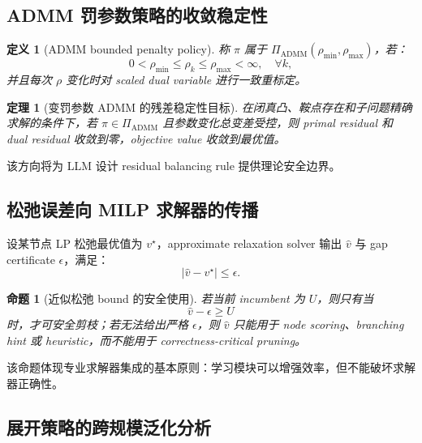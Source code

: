 \documentclass[UTF8,a4paper,12pt,fontset=fandol]{ctexart}
\newtheorem{definition}{定义}
\newtheorem{theorem}{定理}
\newtheorem{proposition}{命题}
\begin{document}
\subsection{ADMM 罚参数策略的收敛稳定性}

\begin{definition}[ADMM bounded penalty policy]
称 $\pi$ 属于 $\Pi_{\mathrm{ADMM}}(\rho_{\min},\rho_{\max})$，若：
\begin{equation}
0 < \rho_{\min}\le \rho_k \le \rho_{\max}<\infty,
\quad \forall k,
\end{equation}
并且每次 $\rho$ 变化时对 scaled dual variable 进行一致重标定。
\end{definition}

\begin{theorem}[变罚参数 ADMM 的残差稳定性目标]
在闭真凸、鞍点存在和子问题精确求解的条件下，若 $\pi\in\Pi_{\mathrm{ADMM}}$ 且参数变化总变差受控，则 primal residual 和 dual residual 收敛到零，objective value 收敛到最优值。
\end{theorem}

该方向将为 LLM 设计 residual balancing rule 提供理论安全边界。

\subsection{松弛误差向 MILP 求解器的传播}

设某节点 LP 松弛最优值为 $v^\star$，approximate relaxation solver 输出 $\hat v$ 与 gap certificate $\epsilon$，满足：
\begin{equation}
|\hat v - v^\star| \le \epsilon.
\end{equation}

\begin{proposition}[近似松弛 bound 的安全使用]
若当前 incumbent 为 $U$，则只有当
\begin{equation}
\hat v - \epsilon \ge U
\end{equation}
时，才可安全剪枝；若无法给出严格 $\epsilon$，则 $\hat v$ 只能用于 node scoring、branching hint 或 heuristic，而不能用于 correctness-critical pruning。
\end{proposition}

该命题体现专业求解器集成的基本原则：学习模块可以增强效率，但不能破坏求解器正确性。

\subsection{展开策略的跨规模泛化分析}
\end{document}
